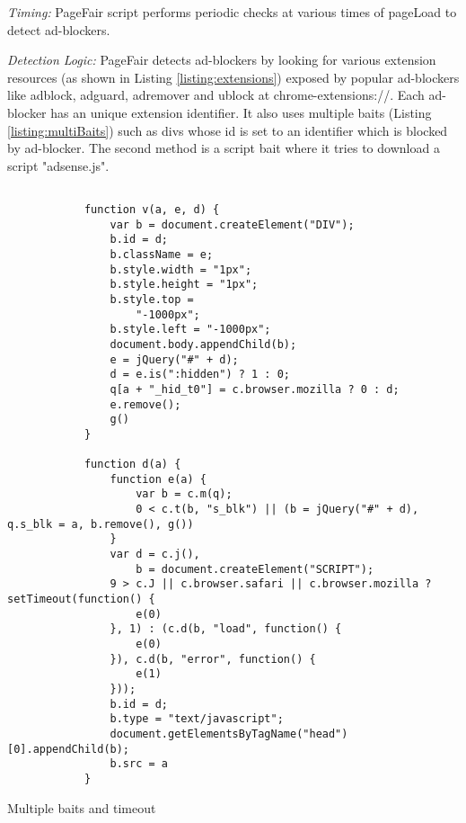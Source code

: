 \documentclass[runningheads,a4paper]{llncs}
\begin{document}
\textit{Timing:} PageFair script performs periodic checks at various times of pageLoad to detect ad-blockers.

\textit{Detection Logic:} PageFair detects ad-blockers by looking for various extension resources (as shown in Listing \ref{listing:extensions}) exposed by popular ad-blockers like adblock, adguard, adremover and ublock at chrome-extensions://. Each ad-blocker has an unique extension identifier. It also uses multiple baits (Listing \ref{listing:multiBaits}) such as divs whose id is set to an identifier which is blocked by ad-blocker. The second method is a script bait where it tries to download a script "adsense.js".

\begin{listing}[!ht]
\begin{verbatim}
               
            function v(a, e, d) {
                var b = document.createElement("DIV");
                b.id = d;
                b.className = e;
                b.style.width = "1px";
                b.style.height = "1px";
                b.style.top =
                    "-1000px";
                b.style.left = "-1000px";
                document.body.appendChild(b);
                e = jQuery("#" + d);
                d = e.is(":hidden") ? 1 : 0;
                q[a + "_hid_t0"] = c.browser.mozilla ? 0 : d;
                e.remove();
                g()
            }

            function d(a) {
                function e(a) {
                    var b = c.m(q);
                    0 < c.t(b, "s_blk") || (b = jQuery("#" + d), q.s_blk = a, b.remove(), g())
                }
                var d = c.j(),
                    b = document.createElement("SCRIPT");
                9 > c.J || c.browser.safari || c.browser.mozilla ? setTimeout(function() {
                    e(0)
                }, 1) : (c.d(b, "load", function() {
                    e(0)
                }), c.d(b, "error", function() {
                    e(1)
                }));
                b.id = d;
                b.type = "text/javascript";
                document.getElementsByTagName("head")[0].appendChild(b);
                b.src = a
            }
\end{verbatim}
\caption{Multiple baits and timeout}
\label{listing:multiBaits}
\end{listing}
\end{document}
